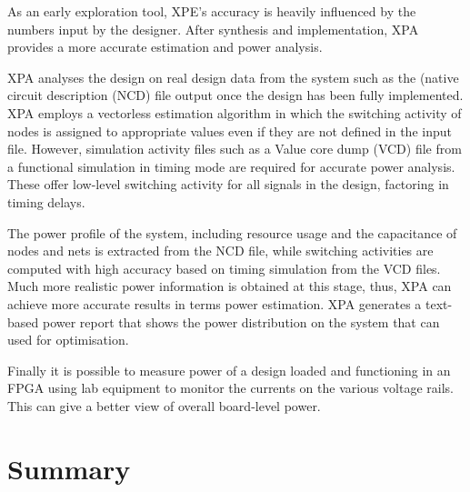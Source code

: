 As an early exploration tool, XPE's accuracy is heavily influenced by the numbers input by the designer.
After synthesis and implementation, XPA provides a more accurate estimation and power analysis.

XPA analyses the design on real design data from the system such as the (native circuit description (NCD) file output once the design has been fully implemented.
XPA employs a vectorless estimation algorithm in which the switching activity of nodes is assigned to appropriate values even if they are not defined in the input file.
However, simulation activity files such as a Value core dump (VCD) file from a functional simulation in timing mode are required for accurate power analysis.
These offer low-level switching activity for all signals in the design, factoring in timing delays.

The power profile of the system, including resource usage and the capacitance of nodes and nets is extracted from the NCD file, while switching activities are computed with high accuracy based on timing simulation from the VCD files. Much more realistic power information is obtained at this stage, thus, XPA can achieve more accurate results in terms power estimation.
XPA generates a text-based power report that shows the power distribution on the system that can used for optimisation.

Finally it is possible to measure power of a design loaded and functioning in an FPGA using lab equipment to monitor the currents on the various voltage rails. This can give a better view of overall board-level power.



\section{Summary}

